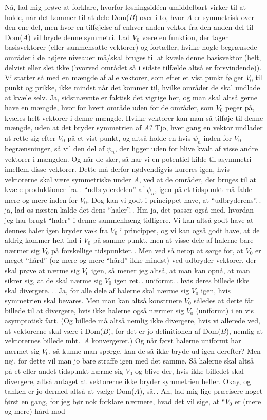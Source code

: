 \documentclass{report}
\begin{document}
Nå, lad mig prøve at forklare, hvorfor løsningsidéen umiddelbart virker til at holde, når det kommer til at dele Dom($B$) over i to, hvor $A$ er symmetrisk over den ene del, men hvor en tilføjelse af enhver anden vektor fra den anden del til Dom($A$) vil bryde denne symmetri. Lad $V_0$ være en funktion, der tager basisvektorer (eller sammensatte vektorer) og fortæller, hvilke nogle begrænsede områder i de højere niveauer må/skal bruges til at kvæle denne basisvektor (helt, delvist eller slet ikke (hvorved området så i sidste tilfælde altså er forsvindende)). Vi starter så med en mængde af alle vektorer, som efter et vist punkt følger $V_0$ til punkt og prikke, ikke mindst når det kommer til, hvilke områder de skal undlade at kvæle selv. Ja, sidstnævnte er faktisk det vigtige her, og man skal altså gerne have en mængde, hvor for hvert område uden for de områder, som $V_0$ peger på, kvæles helt vektorer i denne mængde. Hvilke vektorer kan man så tilføje til denne mængde, uden at det bryder symmetrien af $A$? Tjo, hver gang en vektor undlader at rette sig efter $V_0$ på et vist punkt, og altså holde en hvis $\psi_n$ inden for $V_0$ begrænsninger, så vil den del af $\psi_n$, der ligger uden for blive kvalt af visse andre vektorer i mængden. Og når de sker, så har vi en potentiel kilde til asymmetri imellem disse vektorer. Dette må derfor nødvendigvis kureres igen, hvis vektorerne skal være symmetriske under $A$, ved at de områder, der bruges til at kvæle produktioner fra.\,. ``udbryderdelen'' af $\psi_n$, igen på et tidspunkt må falde mere og mere inden for $V_0$. Dog kan vi godt i princippet have, at ``udbryderens''.\,. ja, lad os næsten kalde det dens ``haler''.\,. Hm ja, det passer også med, hvordan jeg har brugt ``haler'' i denne sammenhæng tidligere. Vi kan altså godt have at dennes haler igen bryder væk fra $V_0$ i princippet, og vi kan også godt have, at de aldrig kommer helt ind i $V_0$ på samme punkt, men at visse dele af halerne bare nærmer sig $V_0$ på forskellige tidspunkter.\,. Men ved så netop at sørge for, at $V_0$ er meget ``hård'' (og mere og mere ``hård'' ikke mindst) ved udbryder-vektorer, der skal prøve at nærme sig $V_0$ igen, så mener jeg altså, at man kan opnå, at man sikrer sig, at de skal nærme sig $V_0$ igen ret.\,. uniformt.\,. hvis deres billede ikke skal divergere. .\,.\,Ja, for alle dele af halerne skal nærme sig $V_0$ igen, hvis symmetrien skal bevares. Men man kan altså konstruere $V_0$ således at dette får billede til at divergere, hvis ikke halerne også nærmer sig $V_0$ (uniformt) i en vis asymptotisk fart. (Og billede må altså nemlig ikke divergere, hvis vi allerede ved, at vektorerne skal være i Dom($B$), for det er jo definitionen af Dom($B$), nemlig at vektorernes billede mht.\ $A$ konvergerer.) Og når først halerne uniformt har nærmet sig $V_0$, så kunne man spørge, kan de så ikke bryde ud igen derefter? Men nej, for dette vil man jo bare straffe igen med det samme. Så halerne skal altså på et eller andet tidspunkt nærme sig $V_0$ og blive der, hvis ikke billedet skal divergere, altså antaget at vektorerne ikke bryder symmetrien heller. Okay, og tanken er jo dermed altså at vælge Dom($A$), så.\,. Ah, lad mig lige præcisere noget først en gang, for jeg bør nok forklare nærmere, hvad det vil sige, at ``$V_0$ er (mere og mere) hård mod 
\end{document}
